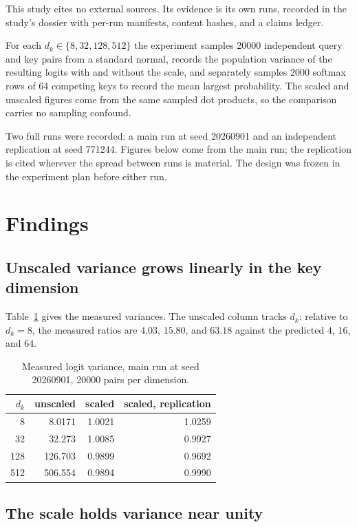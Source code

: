 \documentclass[11pt]{article}
\begin{document}
This study cites no external sources. Its evidence is its own runs, recorded
in the study's dossier with per-run manifests, content hashes, and a claims
ledger.

For each $d_k \in \{8, 32, 128, 512\}$ the experiment samples 20000 independent
query and key pairs from a standard normal, records the population variance of
the resulting logits with and without the scale, and separately samples 2000
softmax rows of 64 competing keys to record the mean largest probability. The
scaled and unscaled figures come from the same sampled dot products, so the
comparison carries no sampling confound.

Two full runs were recorded: a main run at seed 20260901 and an independent
replication at seed 771244. Figures below come from the main run; the
replication is cited wherever the spread between runs is material. The design
was frozen in the experiment plan before either run.

\section{Findings}

\subsection{Unscaled variance grows linearly in the key dimension}

Table~\ref{tab:variance} gives the measured variances. The unscaled column
tracks $d_k$: relative to $d_k = 8$, the measured ratios are $4.03$, $15.80$,
and $63.18$ against the predicted $4$, $16$, and $64$.

\begin{table}[t]
\centering
\caption{Measured logit variance, main run at seed 20260901, 20000 pairs per dimension.}
\label{tab:variance}
\begin{tabular}{rrrr}
\toprule
$d_k$ & unscaled & scaled & scaled, replication \\
\midrule
8 & 8.0171 & 1.0021 & 1.0259 \\
32 & 32.273 & 1.0085 & 0.9927 \\
128 & 126.703 & 0.9899 & 0.9692 \\
512 & 506.554 & 0.9894 & 0.9990 \\
\bottomrule
\end{tabular}
\end{table}

\subsection{The scale holds variance near unity}
\end{document}
